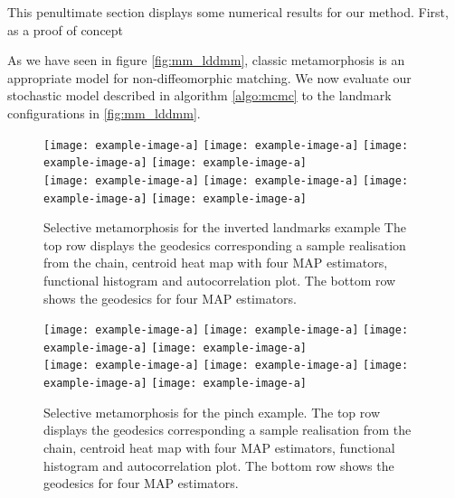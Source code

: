 \documentclass[runningheads]{llncs}
\begin{document}
This penultimate section displays some numerical results for our method. First,
as a proof of concept 

As we have seen in figure \ref{fig:mm_lddmm}, classic metamorphosis is an
appropriate model for non-diffeomorphic matching. We now evaluate our stochastic
model described in algorithm \ref{algo:mcmc} to the landmark configurations in
\ref{fig:mm_lddmm}.

\begin{figure}
\centering
\begin{minipage}{\textwidth}
  \centering
    \texttt{[image: example-image-a]}\quad
    \texttt{[image: example-image-a]}\quad
    \texttt{[image: example-image-a]}\quad
    \texttt{[image: example-image-a]}\\[0.25cm]
    \texttt{[image: example-image-a]}\quad
    \texttt{[image: example-image-a]}\quad
    \texttt{[image: example-image-a]}\quad
    \texttt{[image: example-image-a]}
    \caption{Selective metamorphosis for the inverted landmarks example The top
    row displays the geodesics corresponding a sample realisation from the
    chain, centroid heat map with four MAP estimators, functional histogram and
    autocorrelation plot. The bottom row shows the geodesics for four MAP
    estimators.}
    \label{fig:selective:crisscross}
\end{minipage}
\end{figure}
\begin{figure}
\centering
\begin{minipage}{\textwidth}
  \centering
    \texttt{[image: example-image-a]}\quad
    \texttt{[image: example-image-a]}\quad
    \texttt{[image: example-image-a]}\quad
    \texttt{[image: example-image-a]}\\[0.25cm]
    \texttt{[image: example-image-a]}\quad
    \texttt{[image: example-image-a]}\quad
    \texttt{[image: example-image-a]}\quad
    \texttt{[image: example-image-a]}
    \caption{Selective metamorphosis for the pinch example. The top row displays
    the geodesics corresponding a sample realisation from the chain, centroid
    heat map with four MAP estimators, functional histogram and autocorrelation
    plot. The bottom row shows the geodesics for four MAP estimators.}
    \label{fig:selective:pinch}
\end{minipage}
\end{figure}
\end{document}
